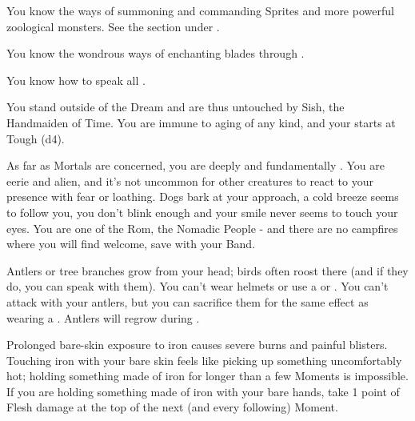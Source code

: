 \begin{multicols*}{2}
    

   You know the ways of summoning and commanding Sprites and more powerful zoological monsters. See the section  under .


  You know the wondrous ways of enchanting blades through . 


  You know how to speak all .


  You stand outside of the Dream and are thus untouched by Sish, the Handmaiden of Time. You are immune to aging of any kind, and your \DEATH starts at Tough (d4).

\newpage



  As far as Mortals are concerned, you are deeply and fundamentally . You are eerie and alien, and it's not uncommon for other creatures to react to your presence with fear or loathing. Dogs bark at your approach, a cold breeze seems to follow you, you don't blink enough and your smile never seems to touch your eyes. You are one of the Rom, the Nomadic People - and there are no campfires where you will find welcome, save with your Band.


  Antlers or tree branches grow from your head; birds often roost there (and if they do, you can speak with them). You can't wear helmets or use a  or . You can't attack with your antlers, but you can sacrifice them for the same effect as wearing a . Antlers will regrow during .

    
    Prolonged bare-skin exposure to iron causes severe burns and painful blisters. Touching iron with your bare skin feels like picking up something uncomfortably hot; holding something made of iron for longer than a few Moments is impossible. If you are holding something made of iron with your bare hands, take 1 point of Flesh damage at the top of the next (and every following) Moment. 


\end{multicols*}
